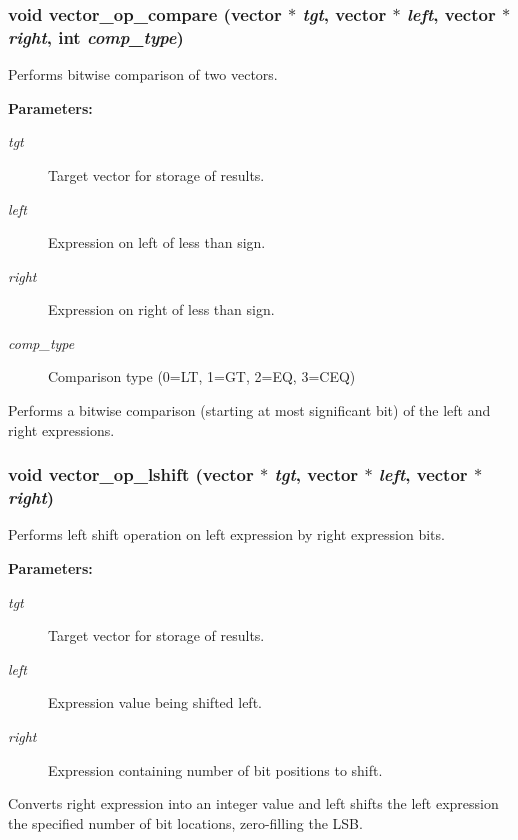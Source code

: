 \subsubsection{\setlength{\rightskip}{0pt plus 5cm}void vector\_\-op\_\-compare ({\bf vector} $\ast$ {\em tgt}, {\bf vector} $\ast$ {\em left}, {\bf vector} $\ast$ {\em right}, int {\em comp\_\-type})}\label{vector_8h_a23}


Performs bitwise comparison of two vectors.

\begin{Desc}
\item[{\bf Parameters: }]\par
\begin{description}
\item[
{\em tgt}]Target vector for storage of results. \item[
{\em left}]Expression on left of less than sign. \item[
{\em right}]Expression on right of less than sign. \item[
{\em comp\_\-type}]Comparison type (0=LT, 1=GT, 2=EQ, 3=CEQ)

\end{description}
\end{Desc}
Performs a bitwise comparison (starting at most significant bit) of the left and right expressions. 
\subsubsection{\setlength{\rightskip}{0pt plus 5cm}void vector\_\-op\_\-lshift ({\bf vector} $\ast$ {\em tgt}, {\bf vector} $\ast$ {\em left}, {\bf vector} $\ast$ {\em right})}\label{vector_8h_a24}


Performs left shift operation on left expression by right expression bits.

\begin{Desc}
\item[{\bf Parameters: }]\par
\begin{description}
\item[
{\em tgt}]Target vector for storage of results. \item[
{\em left}]Expression value being shifted left. \item[
{\em right}]Expression containing number of bit positions to shift.

\end{description}
\end{Desc}
Converts right expression into an integer value and left shifts the left expression the specified number of bit locations, zero-filling the LSB. 
